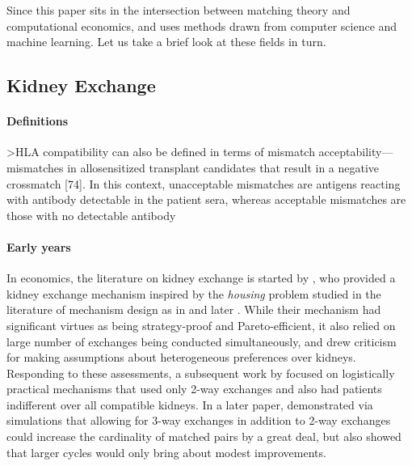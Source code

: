 \documentclass[12pt]{article}
\begin{document}
Since this paper sits in the intersection between matching theory and computational economics, and uses methods drawn from computer science and machine learning. Let us take a brief look at these fields in turn. 



\subsection{Kidney Exchange} \label{subsec:kidney}

\paragraph{Definitions} 


>HLA compatibility can also be defined in terms of
mismatch acceptability—mismatches in allosensitized
transplant candidates that result in a negative crossmatch
[74]. In this context, unacceptable mismatches are antigens
reacting with antibody detectable in the patient
sera, whereas acceptable mismatches are those with no
detectable antibody


\paragraph{Early years} In economics, the literature on kidney exchange is started by \cite{roth2004kidney}, who provided a kidney exchange mechanism inspired by the \emph{housing} problem studied in the literature of mechanism design as in \cite{shapley1974cores} and later \cite{abdulkadirouglu1999house}. While their mechanism had significant virtues as being strategy-proof and Pareto-efficient, it also relied on large number of exchanges being conducted simultaneously, and drew criticism for making assumptions about heterogeneous preferences over kidneys. Responding to these assessments, a subsequent work by \cite{roth2005pairwise} focused on logistically practical mechanisms that used only 2-way exchanges and also had patients indifferent over all compatible kidneys. In a later paper, \cite{roth2007efficient} demonstrated via simulations that allowing for 3-way exchanges in addition to 2-way exchanges could increase the cardinality of matched pairs by a great deal, but also showed that larger cycles would only bring about modest improvements.
\end{document}
